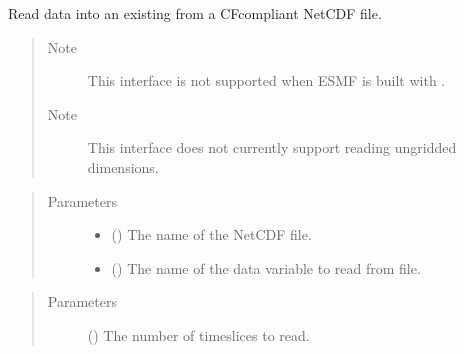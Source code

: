 \documentclass[letterpaper,10pt,english]{sphinxmanual}
\begin{document}
\begin{fulllineitems}
\begin{fulllineitems}
\label{\detokenize{field:ESMF.api.field.Field.read}}
Read data into an existing {\hyperref[\detokenize{field:ESMF.api.field.Field}]{}} from a
CF\sphinxhyphen{}compliant NetCDF file.
\begin{quote}\begin{description}
\item[{Note}] \leavevmode
This interface is not supported when ESMF is built with
.

\item[{Note}] \leavevmode
This interface does not currently support reading ungridded 
dimensions.

\end{description}\end{quote}

\begin{quote}\begin{description}
\item[{Parameters}] \leavevmode\begin{itemize}
\item {} 
 () \textendash{} The name of the NetCDF file.

\item {} 
 () \textendash{} The name of the data variable to read from file.

\end{itemize}

\end{description}\end{quote}

\begin{quote}\begin{description}
\item[{Parameters}] \leavevmode
{} () \textendash{} The number of timeslices to read.

\end{description}\end{quote}

\end{fulllineitems}


\end{fulllineitems}
\end{document}
